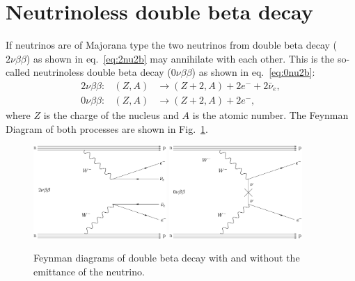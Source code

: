 \section{Neutrinoless double beta decay}
\label{sec:0n2b}
If neutrinos are of Majorana type the two neutrinos from double beta
decay ($2\nu\beta\beta$) as shown in eq.~\ref{eq:2nu2b} may annihilate
with each other. This is the so-called neutrinoless double beta decay
($0\nu\beta\beta$) as shown in eq.~\ref{eq:0nu2b}:
\begin{eqnarray}
  2\nu\beta\beta: &(Z,A)& \rightarrow (Z+2,A) + 2e^{-} +
2\bar{\nu}_{e}, \\\label{eq:2nu2b}
  0\nu\beta\beta: &(Z,A)& \rightarrow (Z+2,A) + 2e^{-},
\label{eq:0nu2b}
\end{eqnarray}
where $Z$ is the charge of the nucleus and $A$ is the atomic number.
The Feynman Diagram of both processes are shown in
Fig.~\ref{fig:2bdecay}.
\begin{figure}[tbhp]
  \centering
  \includegraphics[width=0.45\textwidth]{FD2nu2b.eps} \hfil
  \includegraphics[width=0.45\textwidth]{FD0nu2b.eps}  
  \caption{Feynman diagrams of double beta decay with and without the        
emittance of the neutrino.}
  \label{fig:2bdecay}
\end{figure}

